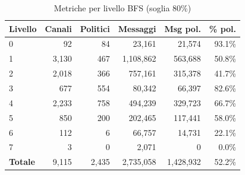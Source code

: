 \begin{table}[htbp]
\centering
\caption{Metriche per livello BFS (soglia 80\%)}
\label{tab:levels_80}
\begin{tabular}{lrrrrr}
\toprule
\textbf{Livello} & \textbf{Canali} & \textbf{Politici} & \textbf{Messaggi} & \textbf{Msg pol.} & \textbf{\% pol.} \\
\midrule
0 & 92 & 84 & 23,161 & 21,574 & 93.1\% \\
1 & 3,130 & 467 & 1,108,862 & 563,688 & 50.8\% \\
2 & 2,018 & 366 & 757,161 & 315,378 & 41.7\% \\
3 & 677 & 554 & 80,342 & 66,397 & 82.6\% \\
4 & 2,233 & 758 & 494,239 & 329,723 & 66.7\% \\
5 & 850 & 200 & 202,465 & 117,441 & 58.0\% \\
6 & 112 & 6 & 66,757 & 14,731 & 22.1\% \\
7 & 3 & 0 & 2,071 & 0 & 0.0\% \\
\midrule
\textbf{Totale} & 9,115 & 2,435 & 2,735,058 & 1,428,932 & 52.2\% \\
\bottomrule
\end{tabular}
\end{table}
